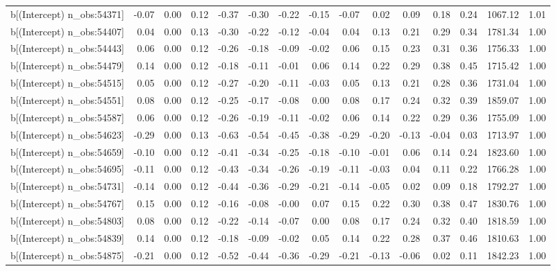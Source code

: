 \begin{table}[ht]
\begin{tabular}{rrrrrrrrrrrrrrr}
  b[(Intercept) n\_obs:54371] & -0.07 & 0.00 & 0.12 & -0.37 & -0.30 & -0.22 & -0.15 & -0.07 & 0.02 & 0.09 & 0.18 & 0.24 & 1067.12 & 1.01 \\ 
  b[(Intercept) n\_obs:54407] & 0.04 & 0.00 & 0.13 & -0.30 & -0.22 & -0.12 & -0.04 & 0.04 & 0.13 & 0.21 & 0.29 & 0.34 & 1781.34 & 1.00 \\ 
  b[(Intercept) n\_obs:54443] & 0.06 & 0.00 & 0.12 & -0.26 & -0.18 & -0.09 & -0.02 & 0.06 & 0.15 & 0.23 & 0.31 & 0.36 & 1756.33 & 1.00 \\ 
  b[(Intercept) n\_obs:54479] & 0.14 & 0.00 & 0.12 & -0.18 & -0.11 & -0.01 & 0.06 & 0.14 & 0.22 & 0.29 & 0.38 & 0.45 & 1715.42 & 1.00 \\ 
  b[(Intercept) n\_obs:54515] & 0.05 & 0.00 & 0.12 & -0.27 & -0.20 & -0.11 & -0.03 & 0.05 & 0.13 & 0.21 & 0.28 & 0.36 & 1731.04 & 1.00 \\ 
  b[(Intercept) n\_obs:54551] & 0.08 & 0.00 & 0.12 & -0.25 & -0.17 & -0.08 & 0.00 & 0.08 & 0.17 & 0.24 & 0.32 & 0.39 & 1859.07 & 1.00 \\ 
  b[(Intercept) n\_obs:54587] & 0.06 & 0.00 & 0.12 & -0.26 & -0.19 & -0.11 & -0.02 & 0.06 & 0.14 & 0.22 & 0.29 & 0.36 & 1755.09 & 1.00 \\ 
  b[(Intercept) n\_obs:54623] & -0.29 & 0.00 & 0.13 & -0.63 & -0.54 & -0.45 & -0.38 & -0.29 & -0.20 & -0.13 & -0.04 & 0.03 & 1713.97 & 1.00 \\ 
  b[(Intercept) n\_obs:54659] & -0.10 & 0.00 & 0.12 & -0.41 & -0.34 & -0.25 & -0.18 & -0.10 & -0.01 & 0.06 & 0.14 & 0.24 & 1823.60 & 1.00 \\ 
  b[(Intercept) n\_obs:54695] & -0.11 & 0.00 & 0.12 & -0.43 & -0.34 & -0.26 & -0.19 & -0.11 & -0.03 & 0.04 & 0.11 & 0.22 & 1766.28 & 1.00 \\ 
  b[(Intercept) n\_obs:54731] & -0.14 & 0.00 & 0.12 & -0.44 & -0.36 & -0.29 & -0.21 & -0.14 & -0.05 & 0.02 & 0.09 & 0.18 & 1792.27 & 1.00 \\ 
  b[(Intercept) n\_obs:54767] & 0.15 & 0.00 & 0.12 & -0.16 & -0.08 & -0.00 & 0.07 & 0.15 & 0.22 & 0.30 & 0.38 & 0.47 & 1830.76 & 1.00 \\ 
  b[(Intercept) n\_obs:54803] & 0.08 & 0.00 & 0.12 & -0.22 & -0.14 & -0.07 & 0.00 & 0.08 & 0.17 & 0.24 & 0.32 & 0.40 & 1818.59 & 1.00 \\ 
  b[(Intercept) n\_obs:54839] & 0.14 & 0.00 & 0.12 & -0.18 & -0.09 & -0.02 & 0.05 & 0.14 & 0.22 & 0.28 & 0.37 & 0.46 & 1810.63 & 1.00 \\ 
  b[(Intercept) n\_obs:54875] & -0.21 & 0.00 & 0.12 & -0.52 & -0.44 & -0.36 & -0.29 & -0.21 & -0.13 & -0.06 & 0.02 & 0.11 & 1842.23 & 1.00 \\ 

\end{tabular}
\end{table}
